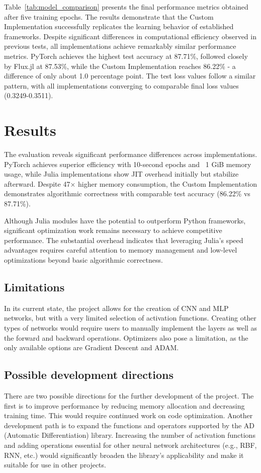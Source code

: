 \documentclass[conference]{IEEEtran}
\begin{document}
Table~\ref{tab:model_comparison} 
presents the final performance metrics obtained after five training epochs.
The results demonstrate that the Custom Implementation successfully replicates the learning 
behavior of established frameworks. Despite significant differences in computational efficiency 
observed in previous tests, all implementations achieve remarkably similar performance metrics. 
PyTorch achieves the highest test accuracy at 87.71\%, followed closely by Flux.jl at 87.53\%, 
while the Custom Implementation reaches 86.22\% - a difference of only about 1.0 percentage point. 
The test loss values follow a similar pattern, with all implementations converging to comparable 
final loss values (0.3249-0.3511).

\section{Results}

The evaluation reveals significant performance differences across implementations. PyTorch 
achieves superior efficiency with 10-second epochs and ~1 GiB memory usage, while Julia 
implementations show JIT overhead initially but stabilize afterward. Despite 47× higher 
memory consumption, the Custom Implementation demonstrates algorithmic correctness with 
comparable test accuracy (86.22\% vs 87.71\%).

Although Julia modules have the potential to outperform Python frameworks, significant 
optimization work remains necessary to achieve competitive performance. The substantial 
overhead indicates that leveraging Julia's speed advantages requires careful attention 
to memory management and low-level optimizations beyond basic algorithmic correctness.

\subsection{Limitations}

In its current state, the project allows for the creation of CNN and MLP networks, but with a very limited selection of activation functions. Creating other types of networks would require users to manually implement the layers as well as the forward and backward operations. Optimizers also pose a limitation, as the only available options are Gradient Descent and ADAM.

\subsection{Possible development directions}
There are two possible directions for the further development of the project. The first is to improve performance by reducing memory allocation and decreasing training time. This would require continued work on code optimization.
Another development path is to expand the functions and operators supported by the AD (Automatic Differentiation) library. Increasing the number of activation functions and adding operations essential for other neural network architectures (e.g., RBF, RNN, etc.) would significantly broaden the library's applicability and make it suitable for use in other projects.
\end{document}
